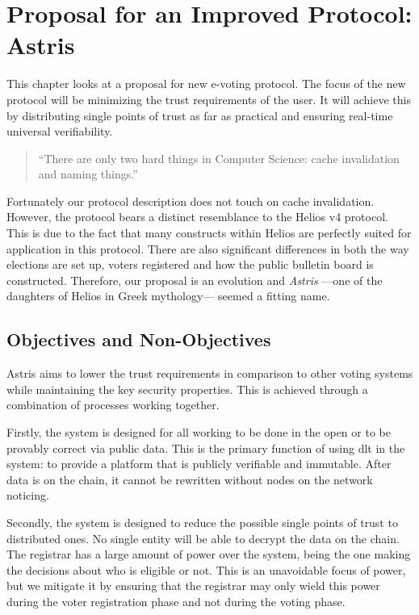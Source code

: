 
\chapter{Proposal for an Improved Protocol: Astris}
\label{ch:astris}

This chapter looks at a proposal for new e-voting protocol. The focus of the new protocol will be minimizing the trust requirements of the user. It will achieve this by distributing single points of trust as far as practical and ensuring real-time universal verifiability.

\begin{quote}
    ``There are only two hard things in Computer Science: cache invalidation and naming things.''

\end{quote}

Fortunately our protocol description does not touch on cache invalidation. However, the protocol bears a distinct resemblance to the Helios v4 protocol. This is due to the fact that many constructs within Helios are perfectly suited for application in this protocol. There are also significant differences in both the way elections are set up, voters registered and how the public bulletin board is constructed. Therefore, our proposal is an evolution and  \emph{Astris} ---one of the daughters of Helios in Greek mythology--- seemed a fitting name.

\section{Objectives and Non-Objectives}
\label{ch:astris:aims}

Astris aims to lower the trust requirements in comparison to other voting systems while maintaining the key security properties. This is achieved through a combination of processes working together.

Firstly, the system is designed for all working to be done in the open or to be provably correct via public data. This is the primary function of using \gls{dlt} in the system: to provide a platform that is publicly verifiable and immutable. After data is on the chain, it cannot be rewritten without nodes on the network noticing.

Secondly, the system is designed to reduce the possible single points of trust to distributed ones. No single entity will be able to decrypt the data on the chain. The registrar has a large amount of power over the system, being the one making the decisions about who is eligible or not. This is an unavoidable focus of power, but we mitigate it by ensuring that the registrar may only wield this power during the voter registration phase and not during the voting phase.

